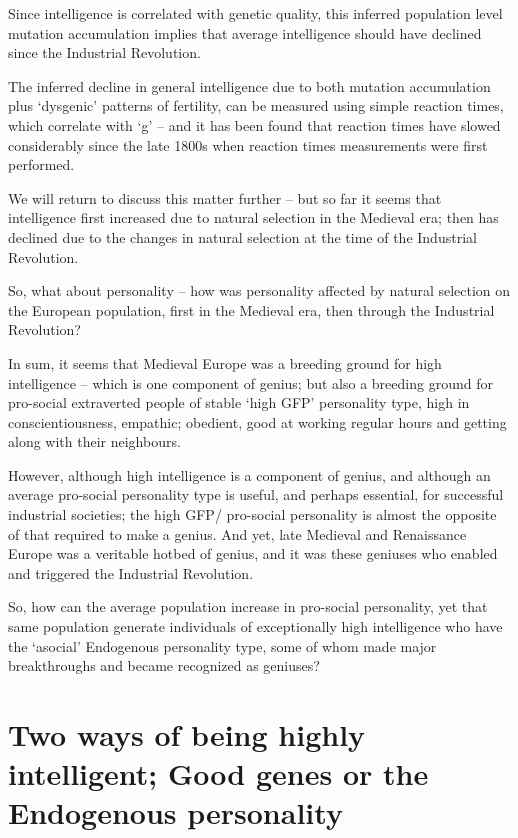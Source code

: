 \documentclass[
]{book}
\begin{document}
Since intelligence is correlated with genetic quality, this inferred population level mutation accumulation implies that average intelligence should have declined since the Industrial Revolution.

The inferred decline in general intelligence due to both mutation accumulation plus `dysgenic' patterns of fertility, can be measured using simple reaction times, which correlate with `g' -- and it has been found that reaction times have slowed considerably since the late 1800s when reaction times measurements were first performed.

We will return to discuss this matter further -- but so far it seems that intelligence first increased due to natural selection in the Medieval era; then has declined due to the changes in natural selection at the time of the Industrial Revolution.

So, what about personality -- how was personality affected by natural selection on the European population, first in the Medieval era, then through the Industrial Revolution?

In sum, it seems that Medieval Europe was a breeding ground for high intelligence -- which is one component of genius; but also a breeding ground for pro-social extraverted people of stable `high GFP' personality type, high in conscientiousness, empathic; obedient, good at working regular hours and getting along with their neighbours.

However, although high intelligence is a component of genius, and although an average pro-social personality type is useful, and perhaps essential, for successful industrial societies; the high GFP/ pro-social personality is almost the opposite of that required to make a genius. And yet, late Medieval and Renaissance Europe was a veritable hotbed of genius, and it was these geniuses who enabled and triggered the Industrial Revolution.

So, how can the average population increase in pro-social personality, yet that same population generate individuals of exceptionally high intelligence who have the `asocial' Endogenous personality type, some of whom made major breakthroughs and became recognized as geniuses?

\hypertarget{two-ways-of-being-highly-intelligent-good-genes-or-the-endogenous-personality}{%
\section{Two ways of being highly intelligent; Good genes or the Endogenous personality}\label{two-ways-of-being-highly-intelligent-good-genes-or-the-endogenous-personality}}
\end{document}
